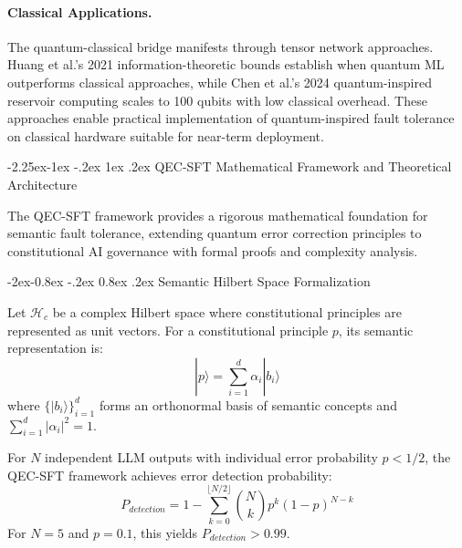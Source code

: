 \documentclass[manuscript,screen,9pt]{acmart}
\makeatletter
\renewcommand\subsection{\@startsection{subsection}{2}{\z@}%
  {-2.25ex\@plus -1ex \@minus -.2ex}%
  {1ex \@plus .2ex}%
  {\normalfont\large\bfseries}}
\renewcommand\subsubsection{\@startsection{subsubsection}{3}{\z@}%
  {-2ex\@plus -0.8ex \@minus -.2ex}%
  {0.8ex \@plus .2ex}%
  {\normalfont\normalsize\bfseries}}
\makeatother
\begin{document}
\paragraph{Classical Applications.} The quantum-classical bridge manifests through tensor network approaches. Huang et al.'s 2021 information-theoretic bounds \cite{Huang2021QuantumML} establish when quantum ML outperforms classical approaches, while Chen et al.'s 2024 quantum-inspired reservoir computing \cite{Chen2024QuantumReservoir} scales to 100 qubits with low classical overhead. These approaches enable practical implementation of quantum-inspired fault tolerance on classical hardware suitable for near-term deployment.

\subsection{QEC-SFT Mathematical Framework and Theoretical Architecture}
\label{subsec:qec_sft_architecture}

The QEC-SFT framework provides a rigorous mathematical foundation for semantic fault tolerance, extending quantum error correction principles to constitutional AI governance with formal proofs and complexity analysis.

\subsubsection{Semantic Hilbert Space Formalization}
\label{subsubsec:semantic_hilbert_space}

\begin{definition}
Let $\mathcal{H}_c$ be a complex Hilbert space where constitutional principles are represented as unit vectors. For a constitutional principle $p$, its semantic representation is:
$$|p\rangle = \sum_{i=1}^{d} \alpha_i |b_i\rangle$$
where $\{|b_i\rangle\}_{i=1}^d$ forms an orthonormal basis of semantic concepts and $\sum_{i=1}^d |\alpha_i|^2 = 1$.
\end{definition}

\begin{theorem}
For $N$ independent LLM outputs with individual error probability $p < 1/2$, the QEC-SFT framework achieves error detection probability:
$$P_{detection} = 1 - \sum_{k=0}^{\lfloor N/2 \rfloor} \binom{N}{k} p^k (1-p)^{N-k}$$
For $N = 5$ and $p = 0.1$, this yields $P_{detection} > 0.99$.
\end{theorem}
\end{document}
